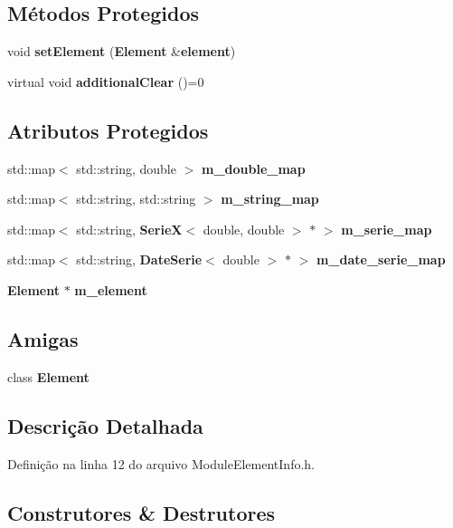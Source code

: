 \subsection*{Métodos Protegidos}
\begin{DoxyCompactItemize}
\item 
void {\bf set\+Element} ({\bf Element} \&{\bf element})
\item 
virtual void {\bf additional\+Clear} ()=0
\end{DoxyCompactItemize}
\subsection*{Atributos Protegidos}
\begin{DoxyCompactItemize}
\item 
std\+::map$<$ std\+::string, double $>$ {\bf m\+\_\+double\+\_\+map}
\item 
std\+::map$<$ std\+::string, std\+::string $>$ {\bf m\+\_\+string\+\_\+map}
\item 
std\+::map$<$ std\+::string, {\bf SerieX}$<$ double, double $>$ $\ast$ $>$ {\bf m\+\_\+serie\+\_\+map}
\item 
std\+::map$<$ std\+::string, {\bf Date\+Serie}$<$ double $>$ $\ast$ $>$ {\bf m\+\_\+date\+\_\+serie\+\_\+map}
\item 
{\bf Element} $\ast$ {\bf m\+\_\+element}
\end{DoxyCompactItemize}
\subsection*{Amigas}
\begin{DoxyCompactItemize}
\item 
class {\bf Element}
\end{DoxyCompactItemize}


\subsection{Descrição Detalhada}


Definição na linha 12 do arquivo Module\+Element\+Info.\+h.



\subsection{Construtores \& Destrutores}

